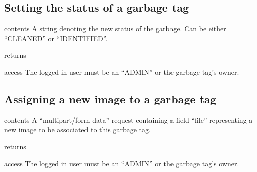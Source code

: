 % 
% 


\subsection{Setting the status of a garbage tag}

\begin{apidata}{contents}
  A string denoting the new status of the garbage. Can be either ``CLEANED'' or
  ``IDENTIFIED''.
\end{apidata}
\begin{apidata}{returns}
  \begin{datalist}
  \end{datalist}
\end{apidata}
\begin{apidata}{access}
The logged in user must be an ``ADMIN'' or the garbage tag's owner.
\end{apidata}


\subsection{Assigning a new image to a garbage tag}

\begin{apidata}{contents}
  A ``multipart/form-data'' request containing a field ``file'' representing a
  new image to be associated to this garbage tag.
\end{apidata}
\begin{apidata}{returns}
  \begin{datalist}
  \end{datalist}
\end{apidata}
\begin{apidata}{access}
The logged in user must be an ``ADMIN'' or the garbage tag's owner.
\end{apidata}


